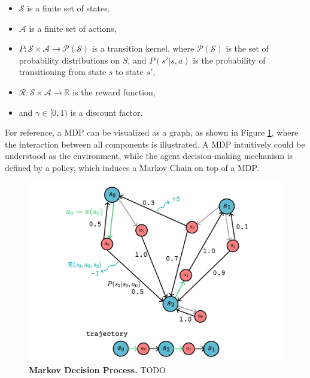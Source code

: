 \begin{itemize}
    \item $\mathcal{S}$ is a finite set of states,
    \item $\mathcal{A}$ is a finite set of actions,
    \item $P : \mathcal{S} \times \mathcal{A} \rightarrow \mathcal{P(S)}$ is a transition kernel, where $\mathcal{P(S)}$ is the set of probability distributions on $S$, and $P(s'|s, a)$ is the probability of transitioning from state $s$ to state $s'$,
    \item $\mathcal{R} : \mathcal{S} \times \mathcal{A}  \rightarrow \mathbb{R}$ is the reward function,
    \item and $\gamma \in [0, 1)$ is a discount factor.
\end{itemize}

For reference, a MDP can be visualized as a graph, as shown in Figure \ref{fig:mdp}, where the interaction between all components is illustrated. A MDP intuitively could be understood as the environment, while the agent decision-making mechanism is defined by a policy, which induces a Markov Chain on top of a MDP.

\begin{figure}[H]
    \centering
    \includegraphics[width=1\linewidth]{Figures/mdp.jpg}
    \caption[Markov Decision Process]{\textbf{Markov Decision Process.} TODO}
    \label{fig:mdp}
\end{figure}




